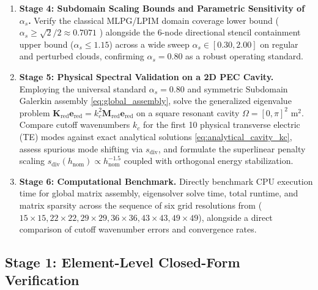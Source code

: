 \documentclass[preprint,12pt]{elsarticle}
\begin{document}
\begin{enumerate}
\begin{equation}
\begin{aligned}
                  |\vec{E}^h - \vec{E}^*|_{H(\mathbf{curl})} \equiv \|(\nabla \times \vec{E}^h)_z - (\nabla \times \vec{E}^*)_z\|_{L^2} & \sim \mathcal{O}(h_{\mathrm{nom}}).
              \end{aligned}
          \end{equation}
    \item \textbf{Stage 4: Subdomain Scaling Bounds and Parametric Sensitivity of $\alpha_s$.} Verify the classical MLPG/LPIM domain coverage lower bound ($\alpha_s \ge \sqrt{2}/2 \approx 0.7071$ \cite{atluri2002meshless, liu2009mesh}) alongside the 6-node directional stencil containment upper bound ($\alpha_s \le 1.15$) across a wide sweep $\alpha_s \in [0.30, 2.00]$ on regular and perturbed clouds, confirming $\alpha_s = 0.80$ as a robust operating standard.
    \item \textbf{Stage 5: Physical Spectral Validation on a 2D PEC Cavity.} Employing the universal standard $\alpha_s = 0.80$ and symmetric Subdomain Galerkin assembly \eqref{eq:global_assembly}, solve the generalized eigenvalue problem $\mathbf{K}_{\mathrm{red}} \mathbf{e}_{\mathrm{red}} = k_c^2 \mathbf{M}_{\mathrm{red}} \mathbf{e}_{\mathrm{red}}$ on a square resonant cavity $\Omega = [0, \pi]^2\text{ m}^2$. Compare cutoff wavenumbers $k_c$ for the first 10 physical transverse electric (TE) modes against exact analytical solutions \eqref{eq:analytical_cavity_kc}, assess spurious mode shifting via $s_{\mathrm{div}}$, and formulate the superlinear penalty scaling $s_{\mathrm{div}}(h_{\mathrm{nom}}) \propto h_{\mathrm{nom}}^{-1.5}$ coupled with orthogonal energy stabilization.
    \item \textbf{Stage 6: Computational Benchmark.} Directly benchmark CPU execution time for global matrix assembly, eigensolver solve time, total runtime, and matrix sparsity across the sequence of six grid resolutions from \cite{stable_vnmm2d_2026} ($15 \times 15, 22 \times 22, 29 \times 29, 36 \times 36, 43 \times 43, 49 \times 49$), alongside a direct comparison of cutoff wavenumber errors and convergence rates.
\end{enumerate}

\subsection{Stage 1: Element-Level Closed-Form Verification}
\label{subsec:stage1_results}
\end{document}
